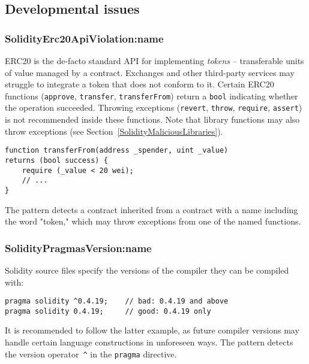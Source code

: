 \subsection{Developmental issues} \label{sec:DevelopmentalIssues}

\subsubsection{\usevalue SolidityErc20ApiViolation:name } \label{SolidityErc20ApiViolation}

ERC20 is the de-facto standard API for implementing \textit{tokens} -- transferable units of value managed by a contract.
Exchanges and other third-party services may struggle to integrate a token that does not conform to it.
Certain ERC20 functions (\texttt{approve}, \texttt{transfer}, \texttt{transferFrom}) return a \texttt{bool} indicating whether the operation succeeded.
Throwing exceptions (\texttt{revert}, \texttt{throw}, \texttt{require}, \texttt{assert}) is not recommended inside these functions.
Note that library functions may also throw exceptions (see Section~\ref{SolidityMaliciousLibraries}).

\begin{lstlisting}[language=Solidity]
function transferFrom(address _spender, uint _value)
returns (bool success) {
	require (_value < 20 wei);
	// ...
}
\end{lstlisting}

The pattern detects a contract inherited from a contract with a name including the word "token," which may throw exceptions from one of the named functions.

\subsubsection{\usevalue SolidityPragmasVersion:name } \label{SolidityPragmasVersion}

Solidity source files specify the versions of the compiler they can be compiled with:
\begin{lstlisting}[language=Solidity]
pragma solidity ^0.4.19;	// bad: 0.4.19 and above
pragma solidity 0.4.19;		// good: 0.4.19 only
\end{lstlisting}
It is recommended to follow the latter example, as future compiler versions may handle certain language constructions in unforeseen ways.
The pattern detects the version operator~\texttt{\^{}} in the \texttt{pragma} directive.

